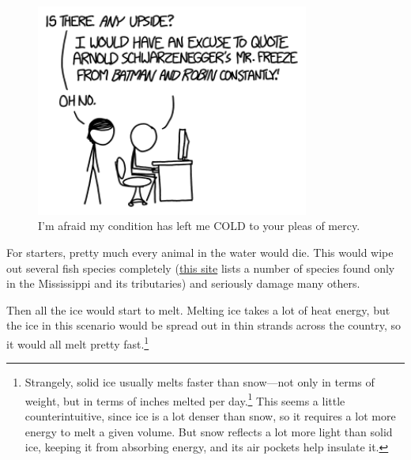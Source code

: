 {\begin{figure}[!htbp]
\centering
\includegraphics[scale=0.5, max width=0.8\textwidth]{imgs/a/121/upside.png}
\caption{I'm afraid my condition has left me COLD to your pleas of mercy.}
\end{figure}

{For starters, pretty much every animal in the water would die. This would wipe out several fish species completely (\href{http://wwf.panda.org/about\_our\_earth/ecoregions/lower\_mississippi\_river.cfm}{this site} lists a number of species found only in the Mississippi and its tributaries) and seriously damage many others.}

{Then all the ice would start to melt. Melting ice takes a lot of heat energy, but the ice in this scenario would be spread out in thin strands across the country, so it would all melt pretty fast.{\footnote{Strangely, solid ice usually melts faster than snow—not only in terms of weight, but in terms of inches melted per day.{\footnote{

Or{\footnote{Whoa, I can nest footnotes!} } centimeters.} } This seems a little counterintuitive, since ice is a lot denser than snow, so it requires a lot more energy to melt a given volume. But snow reflects a lot more light than solid ice, keeping it from absorbing energy, and its air pockets help insulate it.

}}}}
